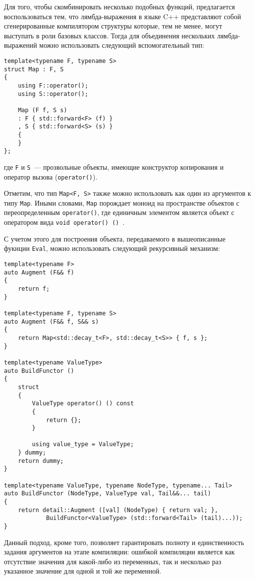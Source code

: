 \documentclass[11pt,a4paper]{article}
\begin{document}
Для того, чтобы скомбинировать несколько подобных функций, предлагается воспользоваться
тем, что лямбда-выражения в языке C++ представляют собой сгенерированные компилятором структуры
которые, тем не менее, могут выступать в роли базовых классов. Тогда для объединения
нескольких лямбда-выражений можно использовать следующий вспомогательный тип:
\begin{lstlisting}
template<typename F, typename S>
struct Map : F, S
{
	using F::operator();
	using S::operator();

	Map (F f, S s)
	: F { std::forward<F> (f) }
	, S { std::forward<S> (s) }
	{
	}
};
\end{lstlisting}
где \texttt{F} и \texttt{S}~--- прозвольные объекты, имеющие конструктор копирования и
оператор вызова (\texttt{operator()}).

Отметим, что тип \texttt{Map<F, S>} также можно использовать как один из аргументов к
типу \texttt{Map}. Иными словами, \texttt{Map} порождает моноид на пространстве объектов
с переопределенным \texttt{operator()}, где единичным элементом является объект с
оператором вида \texttt{void operator() () {}}.

С учетом этого для построения объекта, передаваемого в вышеописанные фукнции
\texttt{Eval}, можно использовать следующий рекурсивный механизм:

\begin{lstlisting}
template<typename F>
auto Augment (F&& f)
{
	return f;
}

template<typename F, typename S>
auto Augment (F&& f, S&& s)
{
	return Map<std::decay_t<F>, std::decay_t<S>> { f, s };
}

template<typename ValueType>
auto BuildFunctor ()
{
	struct
	{
		ValueType operator() () const
		{
			return {};
		}

		using value_type = ValueType;
	} dummy;
	return dummy;
}

template<typename ValueType, typename NodeType, typename... Tail>
auto BuildFunctor (NodeType, ValueType val, Tail&&... tail)
{
	return detail::Augment ([val] (NodeType) { return val; },
			BuildFunctor<ValueType> (std::forward<Tail> (tail)...));
}
\end{lstlisting}

Данный подход, кроме того, позволяет гарантировать полноту и единственность задания
аргументов на этапе компиляции: ошибкой компиляции является как отсутствие значения
для какой-либо из переменных, так и несколько раз указанное значение для одной и той
же переменной.
\end{document}
